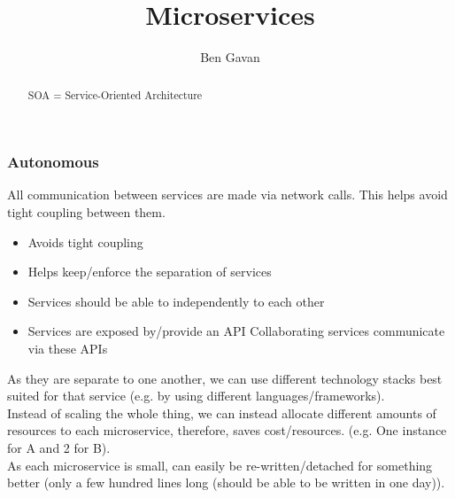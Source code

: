 \documentclass[]{article}
\title{Microservices}
\author{Ben Gavan}
\begin{document}
\maketitle

\begin{abstract}
SOA = Service-Oriented Architecture
\end{abstract}

\section{}
\subsubsection{Autonomous}
All communication between services are made via network calls.  This helps avoid tight coupling between them.
\begin{itemize}
	\item Avoids tight coupling
	\item Helps keep/enforce the separation of services
	\item Services should be able to independently to each other
	\item Services are exposed by/provide an API
	\subitem Collaborating services communicate via these APIs
\end{itemize}
As they are separate to one another, we can use different technology stacks best suited for that service (e.g. by using different languages/frameworks).
\\
Instead of scaling the whole thing, we can instead allocate different amounts of resources to each microservice, therefore, saves cost/resources.  (e.g. One instance for A and 2 for B).
\\
As each microservice is small, can easily be re-written/detached for something better (only a few hundred lines long (should be able to be written in one day)).
\end{document}
